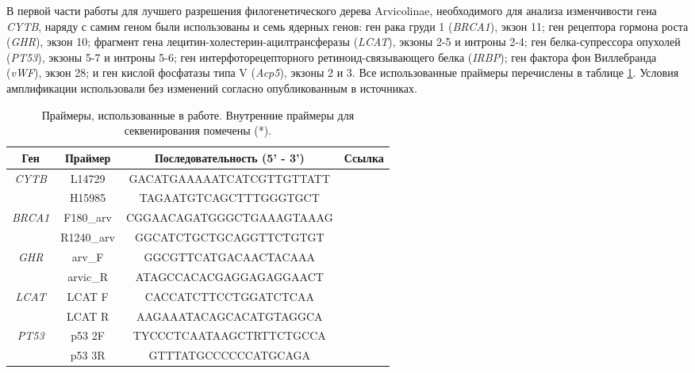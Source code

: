 В первой части работы для лучшего разрешения филогенетического дерева Arvicolinae, необходимого для анализа изменчивости гена \textit{CYTB}, наряду с самим геном были использованы и семь ядерных генов: ген рака груди 1 (\textit{BRCA1}), экзон 11; ген рецептора гормона роста (\textit{GHR}), экзон 10; фрагмент гена лецитин-холестерин-ацилтрансферазы (\textit{LCAT}), экзоны 2-5 и интроны 2-4; ген белка-супрессора опухолей (\textit{PT53}), экзоны 5-7 и интроны 5-6; ген интерфоторецепторного ретиноид-связывающего белка (\textit{IRBP}); ген фактора фон Виллебранда (\textit{vWF}), экзон 28; и ген кислой фосфатазы типа V (\textit{Acp5}), экзоны 2 и 3. Все использованные праймеры перечислены в таблице \ref{primers}. Условия амплификации использовали без изменений согласно опубликованным в источниках. 

\begin{table}[h!]
\caption{Праймеры, использованные в работе. Внутренние праймеры для секвенирования помечены (*).}\label{primers}

\begin{center}

\begin{tabular}{|c|c|c|c|}
	\hline 
\textbf{Ген}	& \textbf{Праймер} & \textbf{Последовательность (5' - 3')} & \textbf{Ссылка} \\ 
	\hline 
\multirow{2}{*}{\textit{CYTB}}	& L14729  & GACATGAAAAATCATCGTTGTTATT & \cite{Lebedev2007} \\ 
	\cline{2-4} 
		& H15985 & TAGAATGTCAGCTTTGGGTGCT & \cite{Ohdachi2001} \\ 
	\hline 

\multirow{2}{*}{\textit{BRCA1}}	& F180\_arv  & CGGAACAGATGGGCTGAAAGTAAAG & \multirow{2}{*}{\cite{Bannikova2013}}\\ 
\cline{2-3} 
& R1240\_arv & GGCATCTGCTGCAGGTTCTGTGT & \\ 
	\hline 

\multirow{2}{*}{\textit{GHR}}	& arv\_F  & GGCGTTCATGACAACTACAAA & \multirow{2}{*}{\cite{Abramson2009}}\\ 
\cline{2-3} 
& arvic\_R & ATAGCCACACGAGGAGAGGAACT & \\ 
\hline 

\multirow{2}{*}{\textit{LCAT}}	& LCAT F  & CACCATCTTCCTGGATCTCAA & \multirow{2}{*}{\cite{Abramson2009}}\\ 
\cline{2-3} 
& LCAT R & AAGAAATACAGCACATGTAGGCA & \\ 
\hline

\multirow{2}{*}{\textit{PT53}}	& p53 2F  & TYCCCTCAATAAGCTRTTCTGCCA & \multirow{2}{*}{\cite{Petrova2016}}\\ 
\cline{2-3} 
& p53 3R & GTTTATGCCCCCCATGCAGA & \\ 
\hline


\end{tabular}
\end{center}
\end{table}
